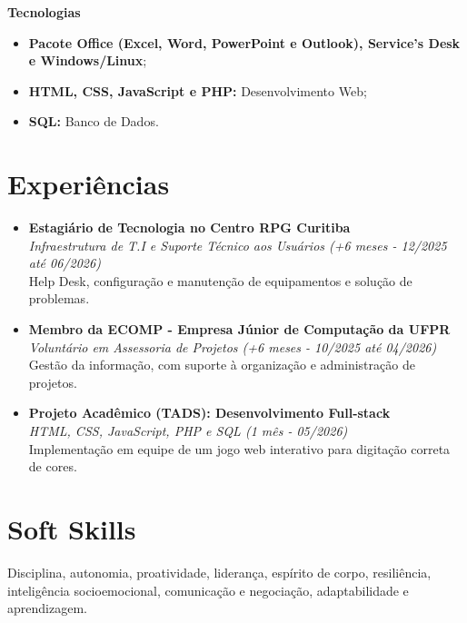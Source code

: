 \documentclass[a4paper,11pt]{article}
\begin{document}
\textbf{Tecnologias}
\begin{itemize}[noitemsep, label={--}]
    \item \textbf{Pacote Office (Excel, Word, PowerPoint e Outlook), Service's Desk e Windows/Linux};
    \item \textbf{HTML, CSS, JavaScript e PHP:} Desenvolvimento Web;
    \item \textbf{SQL:} Banco de Dados.
\end{itemize}

\section*{Experiências}
\begin{itemize}[noitemsep, label={$\bullet$}]
    \item \textbf{Estagiário de Tecnologia no Centro RPG Curitiba}\\
    \textit{Infraestrutura de T.I e Suporte Técnico aos Usuários (+6 meses - 12/2025 até 06/2026)}\\
    Help Desk, configuração e manutenção de equipamentos e solução de problemas.
    \vspace{0.2cm}

    \item \textbf{Membro da ECOMP - Empresa Júnior de Computação da UFPR}\\
    \textit{Voluntário em Assessoria de Projetos (+6 meses - 10/2025 até 04/2026)}\\
    Gestão da informação, com suporte à organização e administração de projetos.
    \vspace{0.2cm}

    \item \textbf{Projeto Acadêmico (TADS): Desenvolvimento Full-stack}\\
    \textit{HTML, CSS, JavaScript, PHP e SQL (1 mês - 05/2026)}\\
    Implementação em equipe de um jogo web interativo para digitação correta de cores.
    \vspace{0.2cm}
\end{itemize}

\section*{Soft Skills}
Disciplina, autonomia, proatividade, liderança, espírito de corpo, resiliência, inteligência socioemocional, comunicação e negociação, adaptabilidade e aprendizagem.
\end{document}
